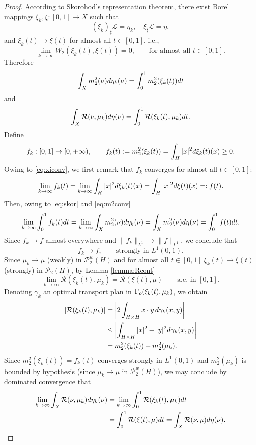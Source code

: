 \documentclass[12pt,a4paper]{article}
\renewcommand{\P}{\mathcal{P}}
\renewcommand{\d}{{\rm d}}
\newcommand{\X}{\mathcal{P}_2(H)}
\theoremstyle{plain}
\theoremstyle{definition}
\begin{document}
\begin{proof}
According to Skorohod's representation theorem, there exist Borel mappings $\xi_k,\xi : [0,1] \to X$ such that
\[
	(\xi_k)_\sharp \mathcal L = \eta_k,\quad 	\xi_\sharp \mathcal L = \eta,
\]
and $\xi_k(t) \to 	\xi(t)$ for almost all $t\in[0,1]$, i.e., 
\begin{equation}
\label{eq:xiconv}
	\lim_{k \to \infty} W_2(\xi_k(t),\xi(t)) =0,\qquad \text{for almost all }t\in[0,1].
\end{equation}
Therefore
\begin{equation}
\label{eq:skor}
	\int_{X} m_2^2(\nu) \d\eta_k(\nu) = \int_0^1 m_2^2(\xi_k(t)) \d t
\end{equation}
and
\[
	\int_{X} \mathcal R(\nu,\mu_k) \d\eta(\nu) = \int_0^1 \mathcal R(\xi_k(t),\mu_k) \d t.
\]
Define
\[
	f_k:[0,1]\to [0,+\infty),\qquad f_k(t) := m_2^2(\xi_k(t))=  \int_H |x|^2\d \xi_k(t)(x) \geq 0.
\]
Owing to \eqref{eq:xiconv}, we first remark that $f_k$ converges for almost all $t\in [0,1]$:
\[
	\lim_{k \to \infty} f_k(t) = \lim_{k \to \infty}  \int_H |x|^2\d \xi_k(t)(x) = \int_H |x|^2\d \xi(t)(x)= :f(t).
\]
Then, owing to \eqref{eq:skor} and \eqref{eq:m2conv} 
\[
	\lim_{k \to \infty} \int_0^1 f_k(t)\d t  = \lim_{k \to \infty} \int_{X} m_2^2(\nu) \d\eta_k(\nu) = \int_{X} m_2^2(\nu) \d\eta(\nu) = \int_0^1 f(t)\d t.
\]	
Since $f_k \to f$ almost everywhere and $\|f_k\|_{L^1} \to \|f\|_{L^1}$, we conclude that 
\begin{equation}
\label{eq:L1} %
	f_k \to f,\qquad \text{strongly in }L^1(0,1).
\end{equation}	
Since $\mu_k \to \mu$ (weakly) in $\P_2^w(H)$ and for almost all $t\in [0,1]$ $\xi_k(t) \to \xi(t)$ (strongly) in $\X$, by Lemma \ref{lemma:Rcont}
\[
	\lim_{k \to \infty} \mathcal R(\xi_k(t),\mu_k) = \mathcal R(\xi(t),\mu)\qquad \text{a.e. in }[0,1].
\]
Denoting $\gamma_k$ an optimal transport plan in $\Gamma_{\rm o}(\xi_k(t),\mu_k)$, we obtain
\begin{align*}
	|\mathcal R(\xi_k(t),\mu_k) | &= \left| 2\int_{H \times H} x\cdot y\, \d\gamma_k(x,y)\right | \\
		&\leq \left| \int_{H \times H} |x|^2+|y|^2 \d\gamma_k(x,y)\right | \\
		&=  m_2^2(\xi_k(t)) + m_2^2(\mu_k).
\end{align*}	
Since $m_2^2(\xi_k(t))=f_k(t)$ converges strongly in $L^1(0,1)$ and $m_2^2(\mu_k)$ is bounded by hypothesis (since $\mu_k \to \mu$ in $\P_2^w(H)$), we may conclude by dominated convergence that
\begin{align*}
    \lim_{k \to \infty}  \int_X \mathcal{R}(\nu,\mu_k) \d \eta_k(\nu) & = \lim_{k \to \infty} \int_0^1 \mathcal{R}(\xi_k(t),\mu_k) \d t \\
    & = \int_0^1 \mathcal{R}(\xi(t),\mu) \d t = \int_X \mathcal{R}(\nu,\mu) \d \eta(\nu).
\end{align*}
\end{proof}
\end{document}

